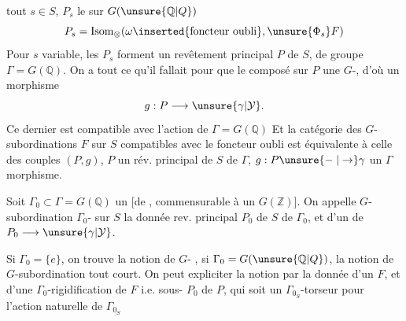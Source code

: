 tout $s\in S$, $P_s$ le  sur $G(\unsure{\mathbb{Q}|Q})$
\[
 P_s=\operatorname{Isom}_{\otimes}(\omega\inserted{\text{foncteur oubli}},\unsure{\Phi_s}F)
\]
Pour $s$ variable, les $P_s$ forment un revêtement principal  $P$ de $S$, de groupe $\Gamma=G(\mathbb{Q})$. On a tout ce qu'il fallait pour que le \unsure{$\otimes$} composé
  sur $P$ une $G$-, d'où un morphisme
\[
 g:P\longrightarrow\unsure{\gamma|\mathcal{Y}}.
\]
 Ce dernier est compatible avec l'action de $\Gamma=G(\mathbb{Q})$  Et la catégorie des  $G$-subordinations $F$ sur $S$ compatibles avec le foncteur oubli est équivalente à celle des couples $(P,g)$, $P$ un rév. principal de $S$ de  $\Gamma$, $g:P\unsure{\relbar|\to}\gamma$ un $\Gamma$ morphisme.

Soit $\Gamma_0\subset\Gamma=G(\mathbb{Q})$ un  [de , commensurable à un $G(\mathbb{Z})$]. On appelle $G$-subordination $\Gamma_0$- sur $S$ la donnée  rev. principal $P_0$ de $S$ de
 $\Gamma_0$, et d'un  de $P_0\longrightarrow\unsure{\gamma|\mathcal{Y}}$.

Si $\Gamma_0=\{e\}$, on trouve la notion de $G$- , si $\Gamma_0=G(\unsure{\mathbb{Q}|Q})$, la notion de $G$-subordination tout court. On peut expliciter la notion par la donnée d'un $F$, et d'une  $\Gamma_0$-rigidification de $F$ i.e.  sous- $P_0$ de $P$, qui soit un  $\Gamma_{0_S}$-torseur pour l'action naturelle de $\Gamma_{0_S}$\,

